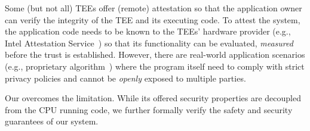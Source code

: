   


 Some (but not all) TEEs offer (remote) attestation so that the application owner can verify the integrity of the TEE and its executing code. To attest the system, the application code needs to be known to the TEEs' hardware provider (e.g., Intel Attestation Service~\cite{ias}) so that its functionality can be evaluated, {\em measured} before the trust is established. However, there are real-world application scenarios (e.g., proprietary algorithm~\cite{}) where the program itself need to comply with strict privacy policies and cannot be {\em openly} exposed to multiple parties. 

 Our \projecttitle{} overcomes the limitation. While its offered security properties are decoupled from the CPU running code, we further formally verify the safety and security guarantees of our system.



